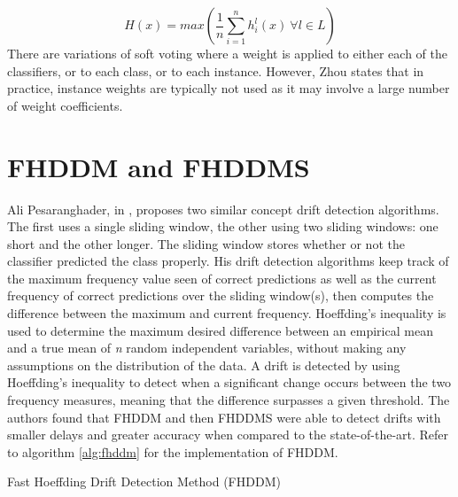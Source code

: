 \begin{equation}
H(x)=max( \frac{1}{n}\sum_{i=1}^nh_i^l(x)\ \forall l \in L)
\label{eq:simple_soft}
\end{equation}
There are variations of soft voting where a weight is applied to either each of the classifiers, or to each class, or to each instance. However, Zhou states that in practice, instance weights are typically not used as it may involve a large number of weight coefficients.


\section{FHDDM and FHDDMS\label{section:fhddm/s}}

Ali Pesaranghader, in \parencite{pesaranghader2018reservoirthesis,pesaranghader2018reservoir, pesaranghader2016fast}, proposes two similar concept drift detection algorithms. The first uses a single sliding window, the other using two sliding windows: one short and the other longer. The sliding window stores whether or not the classifier predicted the class properly. His drift detection algorithms keep track of the maximum frequency value seen of correct predictions as well as the current frequency of correct predictions over the sliding window(s), then computes the difference between the maximum and current frequency. Hoeffding's inequality is used to determine the maximum desired difference between an empirical mean and a true mean of \textit{n} random independent variables, without making any assumptions on the distribution of the data. A drift is detected by using Hoeffding's inequality to detect when a significant change occurs between the two frequency measures, meaning that the difference surpasses a given threshold. The authors found that FHDDM and then FHDDMS were able to detect drifts with smaller delays and greater accuracy when compared to the state-of-the-art. Refer to algorithm \ref{alg:fhddm} for the implementation of FHDDM.

\begin{algorithm}
\caption{Fast Hoeffding Drift Detection Method (FHDDM)\label{alg:fhddm}}


\end{algorithm}